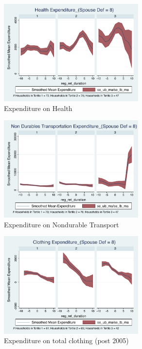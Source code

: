 \documentclass[11pt,onecolumn]{article}
\numberwithin{figure}{section}
\begin{document}
\begin{figure}[h]
	\caption{Expenditure on Health}
	\centering
	\includegraphics[width=0.65\textwidth]{../ConsumptionPostRetirement_by_SpouseDef_Cats/Smoothed/8/spouse_def_total_healthexpense_real.pdf}
\end{figure}

\begin{figure}[h]
	\caption{Expenditure on Nondurable Transport}
	\centering
	\includegraphics[width=0.65\textwidth]{../ConsumptionPostRetirement_by_SpouseDef_Cats/Smoothed/8/spouse_def_total_transport_real.pdf}
\end{figure}

\clearpage

\begin{figure}[h]
	\caption{Expenditure on total clothing (post 2005)}
	\centering
	\includegraphics[width=0.65\textwidth]{../ConsumptionPostRetirement_by_SpouseDef_Cats/Smoothed/8/spouse_def_total_clothing_2005_real.pdf}
\end{figure}
\end{document}
